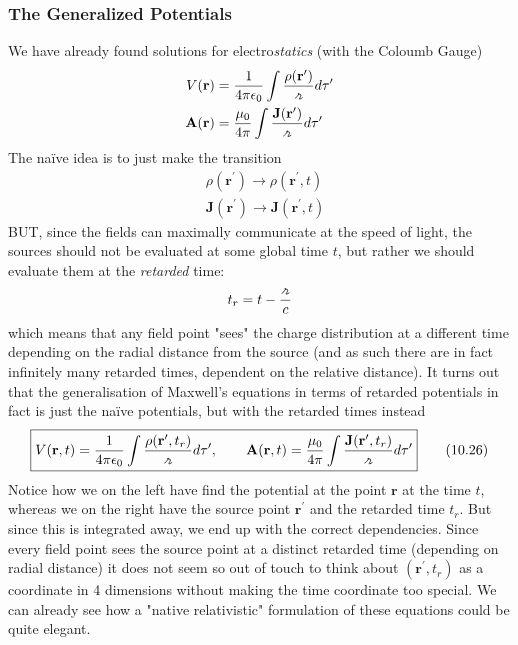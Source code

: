 \subsubsection*{The Generalized Potentials}
We have already found solutions for electro\textit{statics} (with the Coloumb Gauge) \begin{align*}
    V(\mathbf{r}) &= \frac{1}{4\pi\epsilon_0} \int \frac{\rho (\mathbf{r}^{\prime} )}{\griffr[2] } d \tau ^{\prime}\\
    \mathbf{A}(\mathbf{r}) &= \frac{\mu_0}{4 \pi } \int \frac{\mathbf{J}(\mathbf{r}^{\prime} )}{\griffr[2]} d \tau ^{\prime} 
\end{align*}
The naïve idea is to just make the transition \begin{align*}
    &\rho (\mathbf{r}^{\prime} ) \to \rho (\mathbf{r}^{\prime}, t)\\
    &\mathbf{J}(\mathbf{r}^{\prime} ) \to \mathbf{J}(\mathbf{r}^{\prime}, t)
\end{align*}
BUT, since the fields can maximally communicate at the speed of light, the sources should not be evaluated at some global time \(t\), but rather we should evaluate them at the \textit{retarded} time:
\begin{align*}
    t_r = t - \frac{\griffr[2] }{c}
\end{align*} 
which means that any field point "sees" the charge distribution at a different time depending on the radial distance from the source (and as such there are in fact infinitely many retarded times, dependent on the relative distance). It turns out that the generalisation of Maxwell's equations in terms of retarded potentials in fact is just the naïve potentials, but with the retarded times instead \begin{align*}
    \boxed{V(\mathbf{r}, t) = \frac{1}{4\pi\epsilon_0} \int \frac{\rho (\mathbf{r}^{\prime}, t_r )}{\griffr[2] } d \tau ^{\prime}, \qquad \mathbf{A}(\mathbf{r}, t) = \frac{\mu_0}{4 \pi } \int \frac{\mathbf{J}(\mathbf{r}^{\prime}, t_r)}{\griffr[2]} d \tau ^{\prime}} \tag{10.26}
\end{align*}
Notice how we on the left have find the potential at the point \(\mathbf{r}\) at the time \(t\), whereas we on the right have the source point \(\mathbf{r}^{\prime} \)  and the retarded time \(t_r\). But since this is integrated away, we end up with the correct dependencies. Since every field point sees the source point at a distinct retarded time (depending on radial distance) it does not seem so out of touch to think about \((\mathbf{r}^{\prime}, t_r)\) as a coordinate in 4 dimensions without making the time coordinate too special. We can already see how a "native relativistic" formulation of these equations could be quite elegant.


